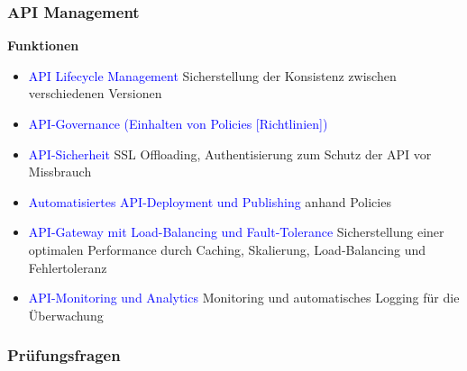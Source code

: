 \subsubsection{API Management}

\textbf{Funktionen}

\begin{itemize}
    \item \textcolor{blue}{API Lifecycle Management} Sicherstellung der Konsistenz zwischen verschiedenen Versionen
    \item \textcolor{blue}{API-Governance (Einhalten von Policies [Richtlinien])}
    \item \textcolor{blue}{API-Sicherheit} SSL Offloading, Authentisierung zum Schutz der API vor Missbrauch
    \item \textcolor{blue}{Automatisiertes API-Deployment und Publishing} anhand Policies
    \item \textcolor{blue}{API-Gateway mit Load-Balancing und Fault-Tolerance} Sicherstellung einer optimalen Performance durch Caching, Skalierung, Load-Balancing und Fehlertoleranz
    \item \textcolor{blue}{API-Monitoring und Analytics} Monitoring und automatisches Logging für die Überwachung
\end{itemize}

\columnbreak
\subsubsection{Prüfungsfragen}

